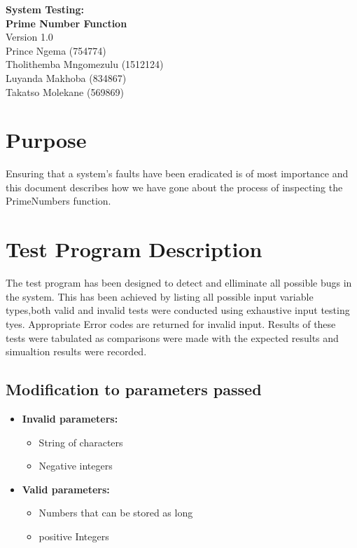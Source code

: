 \documentclass[11 pt]{article}
\begin{document}
  
  \begin{titlepage}
\begin{center}
\huge{\bfseries{System Testing:}}\\
[2mm]
\huge{\bfseries{Prime Number Function}}\\
Version 1.0\\
  \vskip 0.2in
 Prince Ngema (754774)\\
 Tholithemba Mngomezulu (1512124)\\
 Luyanda Makhoba (834867) \\
 Takatso Molekane (569869)\\
 
 

\end{center}
 \end{titlepage}
 \tableofcontents
 \newpage
 \section{Purpose}
Ensuring that a system's faults have been eradicated is of most importance and this document describes how we have gone about the process of inspecting the PrimeNumbers function.
\section{Test Program Description}
The test program has been designed to detect and elliminate all possible bugs in the system. This has been achieved by listing all possible input variable types,both valid and invalid tests were conducted using exhaustive input testing tyes. Appropriate Error codes are returned for invalid input. Results of these tests were tabulated as comparisons were made with the expected results and simualtion results were recorded.
\subsection{Modification to parameters passed}
\begin{itemize}
\item
\textbf{Invalid parameters:}
\begin{itemize}
\item
String of characters
\item
Negative integers
\end{itemize}

\item
\textbf{Valid parameters:}
\begin{itemize}
\item
Numbers that can be stored as long
\item
 positive Integers
\end{itemize}
\end{itemize}
\end{document}
